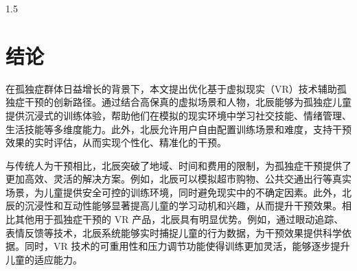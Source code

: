 \documentclass[zihao=-4]{ctexart}
\begin{document}
\begin{spacing}{1.5}

\newpage

\section*{结论}

在孤独症群体日益增长的背景下，本文提出优化基于虚拟现实（VR）技术辅助孤独症干预的创新路径。通过结合高保真的虚拟场景和人物，北辰能够为孤独症儿童提供沉浸式的训练体验，帮助他们在模拟的现实环境中学习社交技能、情绪管理、生活技能等多维度能力。此外，北辰允许用户自由配置训练场景和难度，支持干预效果的实时评估，从而实现个性化、精准化的干预。

与传统人为干预相比，北辰突破了地域、时间和费用的限制，为孤独症干预提供了更加高效、灵活的解决方案。例如，北辰可以模拟超市购物、公共交通出行等真实场景，为儿童提供安全可控的训练环境，同时避免现实中的不确定因素。此外，北辰的沉浸性和互动性能够显著提高儿童的学习动机和兴趣，从而提升干预效果。相比其他用于孤独症干预的 VR 产品，北辰具有明显优势。例如，通过眼动追踪、表情反馈等技术，北辰系统能够实时捕捉儿童的行为数据，为干预效果提供科学依据。同时，VR 技术的可重用性和压力调节功能使得训练更加灵活，能够逐步提升儿童的适应能力。


\end{spacing}
\end{document}
